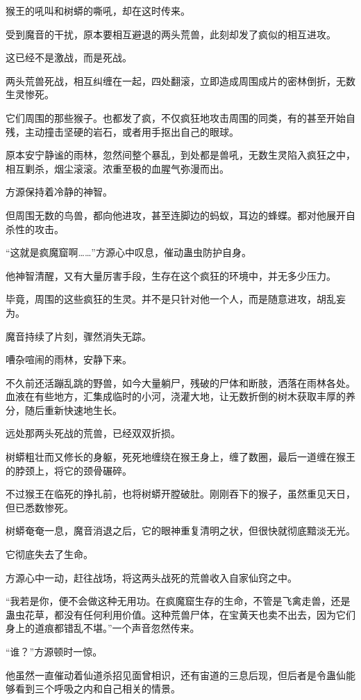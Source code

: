 \begin{this_body}
猴王的吼叫和树蟒的嘶吼，却在这时传来。

受到魔音的干扰，原本要相互避退的两头荒兽，此刻却发了疯似的相互进攻。

这已经不是激战，而是死战。

两头荒兽死战，相互纠缠在一起，四处翻滚，立即造成周围成片的密林倒折，无数生灵惨死。

它们周围的那些猴子。也都发了疯，不仅疯狂地攻击周围的同类，有的甚至开始自残，主动撞击坚硬的岩石，或者用手抠出自己的眼球。

原本安宁静谧的雨林，忽然间整个暴乱，到处都是兽吼，无数生灵陷入疯狂之中，相互剿杀，烟尘滚滚。浓重至极的血腥气弥漫而出。

方源保持着冷静的神智。

但周围无数的鸟兽，都向他进攻，甚至连脚边的蚂蚁，耳边的蜂蝶。都对他展开自杀性的攻击。

“这就是疯魔窟啊……”方源心中叹息，催动蛊虫防护自身。

他神智清醒，又有大量厉害手段，生存在这个疯狂的环境中，并无多少压力。

毕竟，周围的这些疯狂的生灵。并不是只针对他一个人，而是随意进攻，胡乱妄为。

魔音持续了片刻，骤然消失无踪。

嘈杂喧闹的雨林，安静下来。

不久前还活蹦乱跳的野兽，如今大量躺尸，残破的尸体和断肢，洒落在雨林各处。血液在有些地方，汇集成临时的小河，浇灌大地，让无数折倒的树木获取丰厚的养分，随后重新快速地生长。

远处那两头死战的荒兽，已经双双折损。

树蟒粗壮而又修长的身躯，死死地缠绕在猴王身上，缠了数圈，最后一道缠在猴王的脖颈上，将它的颈骨碾碎。

不过猴王在临死的挣扎前，也将树蟒开膛破肚。刚刚吞下的猴子，虽然重见天日，但已悉数惨死。

树蟒奄奄一息，魔音消退之后，它的眼神重复清明之状，但很快就彻底黯淡无光。

它彻底失去了生命。

方源心中一动，赶往战场，将这两头战死的荒兽收入自家仙窍之中。

“我若是你，便不会做这种无用功。在疯魔窟生存的生命，不管是飞禽走兽，还是蛊虫花草，都没有任何利用价值。这种荒兽尸体，在宝黄天也卖不出去，因为它们身上的道痕都错乱不堪。”一个声音忽然传来。

“谁？”方源顿时一惊。

他虽然一直催动着仙道杀招见面曾相识，还有宙道的三息后现，但后者是令蛊仙能够看到三个呼吸之内和自己相关的情景。


\end{this_body}

